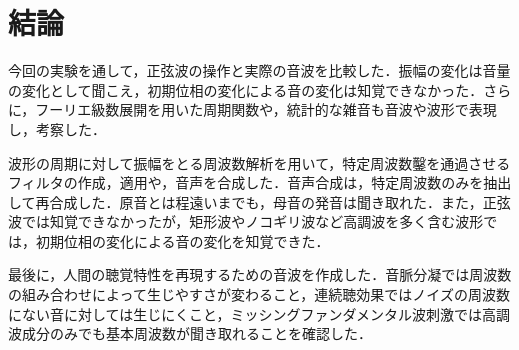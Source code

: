 \chapter{結論}
今回の実験を通して，正弦波の操作と実際の音波を比較した．振幅の変化は音量の変化として聞こえ，初期位相の変化による音の変化は知覚できなかった．さらに，フーリエ級数展開を用いた周期関数や，統計的な雑音も音波や波形で表現し，考察した．\par
波形の周期に対して振幅をとる周波数解析を用いて，特定周波数鑿を通過させるフィルタの作成，適用や，音声を合成した．音声合成は，特定周波数のみを抽出して再合成した．原音とは程遠いまでも，母音の発音は聞き取れた．また，正弦波では知覚できなかったが，矩形波やノコギリ波など高調波を多く含む波形では，初期位相の変化による音の変化を知覚できた．\par
最後に，人間の聴覚特性を再現するための音波を作成した．音脈分凝では周波数の組み合わせによって生じやすさが変わること，連続聴効果ではノイズの周波数にない音に対しては生じにくこと，ミッシングファンダメンタル波刺激では高調波成分のみでも基本周波数が聞き取れることを確認した．